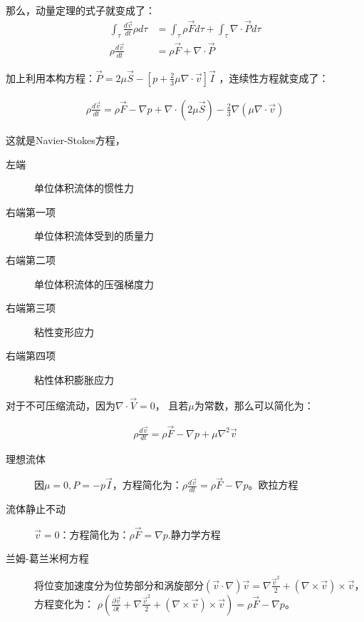 \documentclass[UTF8,12pt]{article}
\begin{document}
那么，动量定理的式子就变成了：
\begin{align*}
    \int_{\tau} \frac{d\vec v}{dt} \rho d\tau
        &= \int_{\tau} \rho \vec F d\tau
        + \int_{\tau} \nabla \cdot \vec P d\tau\\
    \rho \frac{d\vec v}{dt} &= \rho \vec F +
    \nabla \cdot \vec P
\end{align*}

加上利用本构方程：$\vec P = 
2\mu \vec S -
[p + \frac{2}{3}\mu \nabla\cdot \vec v] \vec I
$
，连续性方程就变成了：

\begin{align*}
\rho \frac{d\vec v}{dt} 
    = \rho \vec F
    - \nabla p 
    + \nabla \cdot (2\mu \vec S)
    - \frac{2}{3} \nabla (\mu \nabla \cdot \vec v)
\end{align*}

这就是Navier-Stokes方程，

\begin{description}
    \item[左端] 单位体积流体的惯性力
    \item[右端第一项] 单位体积流体受到的质量力
    \item[右端第二项] 单位体积流体的压强梯度力
    \item[右端第三项] 粘性变形应力
    \item[右端第四项] 粘性体积膨胀应力
\end{description}

对于不可压缩流动，因为$\nabla \cdot \vec V = 0$，
且若$\mu$为常数，那么可以简化为：

\begin{align*}
\rho \frac{d\vec v}{dt}
 = \rho \vec F
 - \nabla p
 + \mu \nabla ^2 \vec v
\end{align*}

\begin{description}
    \item[理想流体] 因$\mu=0,P = -p\vec I$，方程简化为：$\rho \frac{d\vec v}{dt}
 = \rho \vec F
 - \nabla p$。欧拉方程
    \item[流体静止不动] $\vec v=0$：方程简化为：$ \rho \vec F = \nabla p $.静力学方程 
    \item[兰姆-葛兰米柯方程] 将位变加速度分为位势部分和涡旋部分$(\vec v \cdot \nabla )\vec v = \nabla \frac{{\vec v} ^2}{2} + (\nabla \times \vec v)\times \vec v$，方程变化为：
    $\rho(\frac{\partial \vec v }{\partial t}
    + \nabla \frac{{\vec v} ^2}{2} + (\nabla \times \vec v)\times \vec v) 
    = \rho \vec F
 - \nabla p$。
\end{description}
\end{document}
